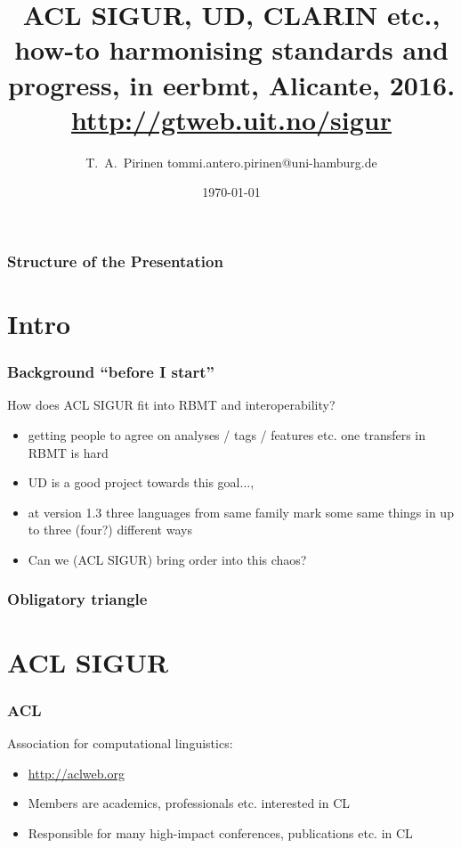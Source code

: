 \documentclass[t]{beamer}
\title{ACL SIGUR, UD, CLARIN etc., how-to harmonising standards and progress,
\scriptsize{in eerbmt, Alicante, 2016.\\
\url{http://gtweb.uit.no/sigur}}}
\author{T.~A.~Pirinen 
\scriptsize \guilsinglleft tommi.antero.pirinen@uni-hamburg.de \guilsinglright }
\institute{Universität Hamburg, ACL SIGUR, CLARIN-D and various others}
\date{\today}
\begin{document}


\maketitle

\begin{frame}
    \frametitle{Structure of the Presentation}
    \tableofcontents
\end{frame}

\section{Intro}

\begin{frame}
    \frametitle{Background ``before I start''}
    How does ACL SIGUR fit into RBMT and interoperability?
    \begin{itemize}
        \item getting people to agree on analyses / tags / features
            etc. one transfers in RBMT is hard
        \item UD is a good project towards this goal...,
        \item at version 1.3 three languages from same family mark some same
            things in up to three (four?) different ways
        \item Can we (ACL SIGUR) bring order into this chaos?
    \end{itemize}
\end{frame}

\begin{frame}
    \frametitle{Obligatory triangle}
\end{frame}

\section{ACL SIGUR}

\begin{frame}
    \frametitle{ACL}
    Association for computational linguistics:
    \begin{itemize}
        \item \url{http://aclweb.org}
        \item Members are academics, professionals etc. interested in CL
        \item Responsible for many high-impact conferences, publications
            etc. in CL
    \end{itemize}
\end{frame}
\end{document}
